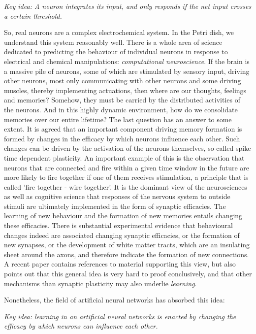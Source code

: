 \emph{Key idea: A neuron integrates its input, and only responds if the net input crosses a certain threshold.}

So, real neurons are a complex electrochemical system. In the Petri dish, we understand this system reasonably well. There is a whole area
of science dedicated to predicting the behaviour of individual neurons in response to electrical and chemical manipulations: \emph{computational
  neuroscience}. If the brain is a massive pile of neurons, some of which are stimulated by sensory input, driving other neurons, most only communicating
with other neurons and some driving muscles, thereby implementing actuations, then where are our thoughts, feelings and memories? Somehow, they must be
carried by the distributed activities of the neurons. And in this highly dynamic environment, how do we consolidate memories over our entire lifetime?
The last question has an answer to some extent. It is agreed that an important component driving memory formation is formed by changes in the
efficacy by which neurons influence each other. Such changes can be driven by the activation of the neurons themselves, so-called spike time
dependent plasticity. An important example of this is the observation that neurons that are connected and fire within a given time window in the future
are more likely to fire together if one of them receives stimulation, a principle that is called 'fire together - wire together'. It is the dominant view
of the neurosciences as well as cognitive science that responses of the nervous system to outside stimuli are ultimately implemented in the form of
synaptic efficacies. The learning of new behaviour and the formation of new memories entails changing these efficacies. There is substantial
experimental evidence that behavioural changes indeed are associated changing synaptic efficacies, or the formation of new synapses, or the development
of white matter tracts, which are an insulating sheet around the axons, and therefore indicate the formation of new connections. A recent paper
\cite{abraham2019} contains references to material supporting this view, but also points out that this general idea is very hard to proof conclusively, and that
other mechanisms than synaptic plasticity may also underlie \emph{learning}.

Nonetheless, the field of artificial neural networks has absorbed this idea:

\emph{Key idea: learning in an artificial neural networks is enacted by changing the efficacy by which neurons can influence each other.}

